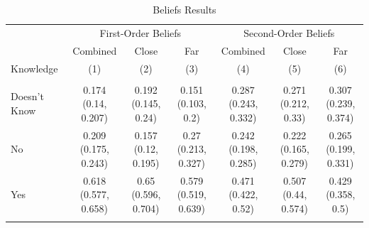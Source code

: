 \documentclass[
]{article}
\begin{document}
\begin{table}
\centering
\caption{\label{tab:unnamed-chunk-12}Beliefs Results}
\centering
\begin{tabular}[t]{lcccccc}
\toprule
\multicolumn{1}{c}{ } & \multicolumn{3}{c}{First-Order Beliefs} & \multicolumn{3}{c}{Second-Order Beliefs} \\
\cmidrule(l{3pt}r{3pt}){2-4} \cmidrule(l{3pt}r{3pt}){5-7}
\multicolumn{1}{c}{ } & \multicolumn{1}{c}{Combined} & \multicolumn{1}{c}{Close} & \multicolumn{1}{c}{Far} & \multicolumn{1}{c}{Combined} & \multicolumn{1}{c}{Close} & \multicolumn{1}{c}{Far} \\
Knowledge & (1) & (2) & (3) & (4) & (5) & (6)\\
\midrule
\addlinespace[0.3em]
\hline
\multicolumn{7}{l}{\textbf{Bracelet}}\\
\hline
\hspace{1em}Doesn't Know & \makecell[c]{0.174\\(0.14, 0.207)} & \makecell[c]{0.192\\(0.145, 0.24)} & \makecell[c]{0.151\\(0.103, 0.2)} & \makecell[c]{0.287\\(0.243, 0.332)} & \makecell[c]{0.271\\(0.212, 0.33)} & \makecell[c]{0.307\\(0.239, 0.374)}\\
\hspace{1em}No & \makecell[c]{0.209\\(0.175, 0.243)} & \makecell[c]{0.157\\(0.12, 0.195)} & \makecell[c]{0.27\\(0.213, 0.327)} & \makecell[c]{0.242\\(0.198, 0.285)} & \makecell[c]{0.222\\(0.165, 0.279)} & \makecell[c]{0.265\\(0.199, 0.331)}\\
\hspace{1em}Yes & \makecell[c]{0.618\\(0.577, 0.658)} & \makecell[c]{0.65\\(0.596, 0.704)} & \makecell[c]{0.579\\(0.519, 0.639)} & \makecell[c]{0.471\\(0.422, 0.52)} & \makecell[c]{0.507\\(0.44, 0.574)} & \makecell[c]{0.429\\(0.358, 0.5)}\\
\addlinespace[0.3em]
\hline
\multicolumn{7}{l}{\textbf{Calendar}}\\

\end{tabular}
\end{table}
\end{document}
